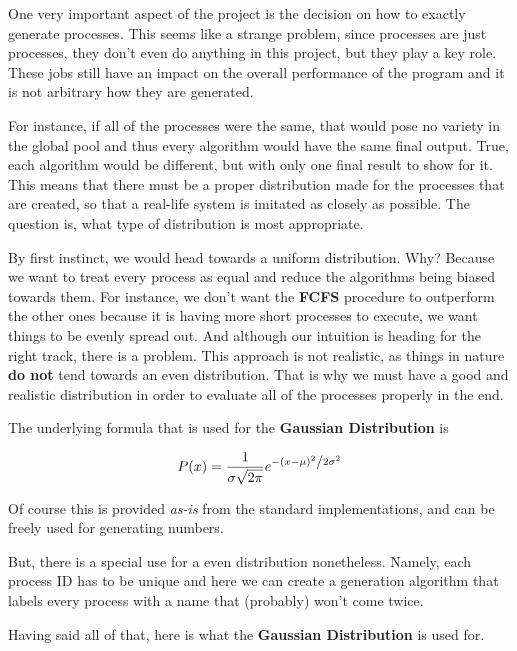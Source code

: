 \documentclass{article}
\newcommand{\code}[1]{\codeinline{\texttt{#1}}}
\begin{document}
One very important aspect of the project is the decision on how to exactly generate processes. This seems like a strange problem, since processes are just processes, they don't even do anything in this project, but they play a key role. These jobs still have an impact on the overall performance of the program and it is not arbitrary how they are generated.

For instance, if all of the processes were the same, that would pose no variety in the global pool and thus every algorithm would have the same final output. True, each algorithm would be different, but with only one final result to show for it. This means that there must be a proper distribution made for the processes that are created, so that a real-life system is imitated as closely as possible. The question is, what type of distribution is most appropriate.

By first instinct, we would head towards a uniform distribution. Why? Because we want to treat every process as equal and reduce the algorithms being biased towards them. For instance, we don't want the \textbf{FCFS} procedure to outperform the other ones because it is having more short processes to execute, we want things to be evenly spread out. And although our intuition is heading for the right track, there is a problem. This approach is not realistic, as things in nature \textbf{do not} tend towards an even distribution. That is why we must have a good and realistic distribution in order to evaluate all of the processes properly in the end.

The underlying formula that is used for the \textbf{Gaussian Distribution} is

\begin{equation}
P(x) = \frac{1}{{\sigma \sqrt {2\pi } }}e^{{{ - \left( {x - \mu } \right)^2 } \mathord{\left/ {\vphantom {{ - \left( {x - \mu } \right)^2 } {2\sigma ^2 }}} \right. \kern-\nulldelimiterspace} {2\sigma ^2 }}}
\end{equation}

Of course this is provided \textit{as-is} from the standard \code{C++} implementations, and can be freely used for generating numbers.

But, there is a special use for a even distribution nonetheless. Namely, each process ID has to be unique and here we can create a generation algorithm that labels every process with a name that (probably) won't come twice.

Having said all of that, here is what the \textbf{Gaussian Distribution} is used for.
\end{document}
